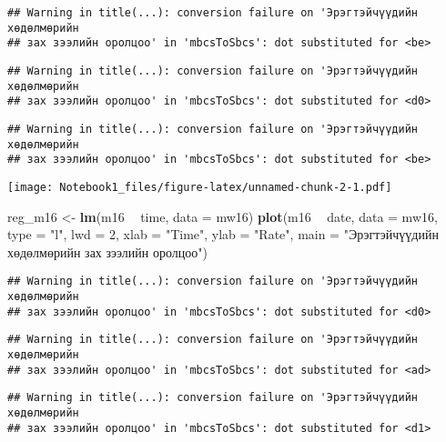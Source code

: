 \documentclass[]{article}
\newenvironment{Shaded}{\begin{snugshade}}{\end{snugshade}}
\newcommand{\DataTypeTok}[1]{\textcolor[rgb]{0.13,0.29,0.53}{#1}}
\newcommand{\DecValTok}[1]{\textcolor[rgb]{0.00,0.00,0.81}{#1}}
\newcommand{\KeywordTok}[1]{\textcolor[rgb]{0.13,0.29,0.53}{\textbf{#1}}}
\newcommand{\NormalTok}[1]{#1}
\newcommand{\OperatorTok}[1]{\textcolor[rgb]{0.81,0.36,0.00}{\textbf{#1}}}
\newcommand{\StringTok}[1]{\textcolor[rgb]{0.31,0.60,0.02}{#1}}
\begin{document}
\begin{verbatim}
## Warning in title(...): conversion failure on 'Эрэгтэйчүүдийн хөдөлмөрийн
## зах зээлийн оролцоо' in 'mbcsToSbcs': dot substituted for <be>
\end{verbatim}

\begin{verbatim}
## Warning in title(...): conversion failure on 'Эрэгтэйчүүдийн хөдөлмөрийн
## зах зээлийн оролцоо' in 'mbcsToSbcs': dot substituted for <d0>
\end{verbatim}

\begin{verbatim}
## Warning in title(...): conversion failure on 'Эрэгтэйчүүдийн хөдөлмөрийн
## зах зээлийн оролцоо' in 'mbcsToSbcs': dot substituted for <be>
\end{verbatim}

\texttt{[image: Notebook1\_files/figure-latex/unnamed-chunk-2-1.pdf]}

\begin{Shaded}
\begin{Highlighting}[]
\NormalTok{reg_m16 <-}\StringTok{ }\KeywordTok{lm}\NormalTok{(m16 }\OperatorTok{~}\StringTok{ }\NormalTok{time, }\DataTypeTok{data =}\NormalTok{ mw16)}
\KeywordTok{plot}\NormalTok{(m16 }\OperatorTok{~}\StringTok{ }\NormalTok{date, }\DataTypeTok{data =}\NormalTok{ mw16, }
     \DataTypeTok{type =} \StringTok{"l"}\NormalTok{, }
     \DataTypeTok{lwd  =} \DecValTok{2}\NormalTok{, }
     \DataTypeTok{xlab =} \StringTok{"Time"}\NormalTok{, }
     \DataTypeTok{ylab =} \StringTok{"Rate"}\NormalTok{, }
     \DataTypeTok{main =} \StringTok{"Эрэгтэйчүүдийн хөдөлмөрийн зах зээлийн оролцоо"}\NormalTok{)}
\end{Highlighting}
\end{Shaded}

\begin{verbatim}
## Warning in title(...): conversion failure on 'Эрэгтэйчүүдийн хөдөлмөрийн
## зах зээлийн оролцоо' in 'mbcsToSbcs': dot substituted for <d0>
\end{verbatim}

\begin{verbatim}
## Warning in title(...): conversion failure on 'Эрэгтэйчүүдийн хөдөлмөрийн
## зах зээлийн оролцоо' in 'mbcsToSbcs': dot substituted for <ad>
\end{verbatim}

\begin{verbatim}
## Warning in title(...): conversion failure on 'Эрэгтэйчүүдийн хөдөлмөрийн
## зах зээлийн оролцоо' in 'mbcsToSbcs': dot substituted for <d1>
\end{verbatim}
\end{document}

